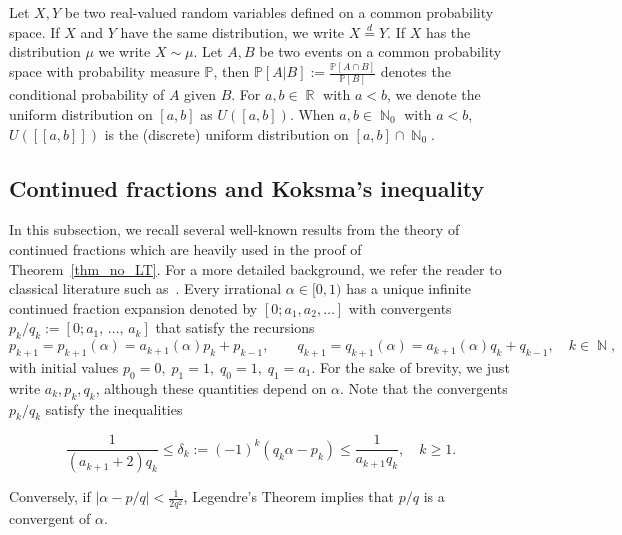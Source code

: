\documentclass[AHL,Unicode,longabstracts,published]{cedram}
\DeclareMathOperator{\R}{\mathbb{R}}
\DeclareMathOperator{\N}{\mathbb{N}}
\newcommand{\bbP}{\mathbb{P}}
\begin{document}
Let $X,Y$ be two real-valued random variables defined on a common probability space. If $X$ and $Y$ have the same distribution, we write $X \stackrel{d}{=} Y$. If $X$ has the distribution $\mu$ we write $X \sim \mu$. Let $A,B$ be two events on a common probability space with probability measure $\bbP$, then $\bbP [A|B] := \frac{ \bbP[A \cap B]}{\bbP [B]} $ denotes the conditional probability of $A$ given $B$. For $a,b \in \R$ with $a<b$, we denote the uniform distribution on $[a,b]$ as $U([a,b])$. When $a,b \in \N_0$ with $a < b$, $U([\![a,b]\!])$ is the (discrete) uniform distribution on $[a,b] \cap \N_0$.


\subsection*{Continued fractions and Koksma's inequality}\label{cf_prop}


In this subsection, we recall several well-known results from the theory of continued fractions which are heavily used in the proof of Theorem~\ref{thm_no_LT}. For a more detailed background, we refer the reader to classical literature such as~\cite{all_shall,rock_sz}. Every irrational $\alpha \in [0,1)$ has a unique infinite continued fraction expansion denoted by $[0;a_1,a_2,\dots]$ with convergents $p_k/q_k := [0;a_1,\,\dots,\,a_k]$ that satisfy the recursions
\begin{equation*}
p_{k+1} = p_{k+1}(\alpha) = a_{k+1}(\alpha) p_k + p_{k-1}, \qquad q_{k+1} = q_{k+1}(\alpha) = a_{k+1}(\alpha) q_k + q_{k-1}, \quad k \in \N,
\end{equation*}
with initial values $p_0 = 0,\; p_1 = 1,\; q_0 = 1,\; q_1 = a_1$. For the sake of brevity, we just write $a_k, p_k, q_k$, although these quantities depend on $\alpha$. Note that the convergents $p_k/q_k$ satisfy the inequalities

\begin{equation}\label{Eq_parity_deltak}
\frac{1}{(a_{k+1} +2)q_{k}} \leq \delta_k := (-1)^k (q_k \alpha - p_k) \leq
\frac{1}{a_{k+1}q_k}, \quad k \geq 1.
\end{equation}

Conversely, if $| \alpha - p/q| < \frac{1}{2q^2}$, Legendre's Theorem implies that $p/q$ is a convergent of $\alpha$.
\end{document}
